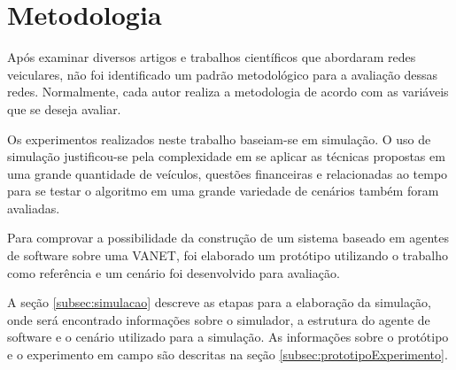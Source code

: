 \section{Metodologia}
\label{sec:metodologia}

Após examinar diversos artigos e trabalhos científicos que abordaram redes veiculares, não foi identificado um padrão metodológico para a avaliação dessas redes. Normalmente, cada autor realiza a metodologia de acordo com as variáveis que se deseja avaliar. 

Os experimentos realizados neste trabalho baseiam-se em simulação. O uso de simulação justificou-se pela complexidade em se aplicar as técnicas propostas em uma grande quantidade de veículos, questões financeiras e relacionadas ao tempo para se testar o algoritmo em uma grande variedade de cenários também foram avaliadas.

Para comprovar a possibilidade da construção de um sistema baseado em agentes de software sobre uma VANET, foi elaborado um protótipo utilizando o trabalho \cite{santanaMestrado:2014} como referência e um cenário foi desenvolvido para avaliação.

A seção \ref{subsec:simulacao} descreve as etapas para a elaboração da simulação, onde será encontrado informações sobre o simulador, a estrutura do agente de software e o cenário utilizado para a simulação. As informações sobre o protótipo e o experimento em campo são descritas na seção \ref{subsec:prototipoExperimento}.






